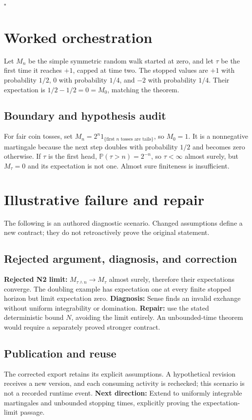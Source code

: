 \documentclass[preprint,12pt,aps,pra,showkeys,amsmath,amssymb,superscriptaddress,floatfix]{revtex4-2}
\theoremstyle{definition}
\theoremstyle{remark}
\begin{document}
\hfill$\square$

\section{Worked orchestration}

Let \(M_n\) be the simple symmetric random walk started at zero, and let
\(\tau\) be the first time it reaches \(+1\), capped at time two. The
stopped values are \(+1\) with probability \(1/2\), \(0\) with
probability \(1/4\), and \(-2\) with probability \(1/4\). Their
expectation is \(1/2-1/2=0=M_0\), matching the theorem.

\subsection{Boundary and hypothesis audit}

For fair coin tosses, set
\(M_n=2^n1_{\{\text{first }n\text{ tosses are tails}\}}\), so \(M_0=1\).
It is a nonnegative martingale because the next step doubles with
probability \(1/2\) and becomes zero otherwise. If \(\tau\) is the first
head, \(\mathbb P(\tau>n)=2^{-n}\), so \(\tau<\infty\) almost surely,
but \(M_\tau=0\) and its expectation is not one. Almost sure finiteness
is insufficient.

\section{Illustrative failure and repair}

The following is an authored diagnostic scenario. Changed assumptions
define a new contract; they do not retroactively prove the original
statement.

\subsection{Rejected argument, diagnosis, and correction}
\textbf{Rejected N2 limit:} \(M_{\tau\wedge n}\to M_\tau\) almost
surely, therefore their expectations converge. The doubling example has
expectation one at every finite stopped horizon but limit expectation
zero. \textbf{Diagnosis:} Sense finds an invalid exchange without
uniform integrability or domination. \textbf{Repair:} use the stated
deterministic bound \(N\), avoiding the limit entirely. An
unbounded-time theorem would require a separately proved stronger
contract.

\subsection{Publication and reuse}
The corrected export retains its explicit assumptions. A hypothetical
revision receives a new version, and each consuming activity is
rechecked; this scenario is not a recorded runtime event. \textbf{Next
direction:} Extend to uniformly integrable martingales and unbounded
stopping times, explicitly proving the expectation-limit passage.
\end{document}
